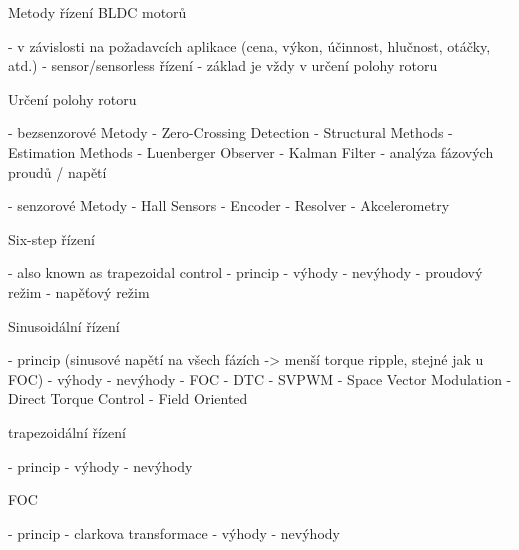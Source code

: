 

\chap Metody řízení BLDC motorů

- v závislosti na požadavcích aplikace (cena, výkon, účinnost, hlučnost, otáčky, atd.)
- sensor/sensorless řízení
- základ je vždy v určení polohy rotoru

\sec Určení polohy rotoru

- bezsenzorové Metody
    - Zero-Crossing Detection
    - Structural Methods
    - Estimation Methods
    - Luenberger Observer
    - Kalman Filter
    - analýza fázových proudů / napětí

- senzorové Metody
    - Hall Sensors
    - Encoder
    - Resolver
    - Akcelerometry


\sec Six-step řízení

    - also known as trapezoidal control
    - princip
    - výhody
    - nevýhody
    - proudový režim
    - napěťový režim
    
\sec Sinusoidální řízení

    - princip (sinusové napětí na všech fázích -> menší torque ripple, stejné jak u FOC)  
    - výhody
    - nevýhody
    - FOC
    - DTC
    - SVPWM
    - Space Vector Modulation
    - Direct Torque Control
    - Field Oriented

\sec trapezoidální řízení

    - princip
    - výhody
    - nevýhody


\sec FOC

- princip
- clarkova transformace
- výhody
- nevýhody
